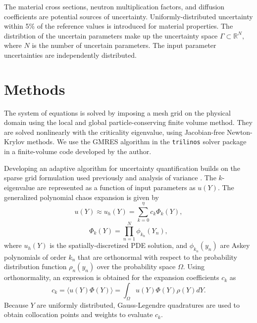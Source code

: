 \documentclass{anstrans} \usepackage{amsmath} \usepackage{amssymb}
\begin{document}
The material cross sections, neutron multiplication factors, and diffusion coefficients are potential
sources of uncertainty.  Uniformly-distributed uncertainty within 5\% of the reference
values is introduced for material properties.  The distribtion of the uncertain parameters  make up 
the uncertainty space
$\Gamma\subset\mathbb{R}^N,$ where $N$ is the number of uncertain parameters.
The input parameter uncertainties are independently distributed.

\section{Methods}
The system of equations is solved by imposing a mesh grid on the physical domain using the local and global
particle-conserving finite volume method.  They are solved nonlinearly with the criticality
eigenvalue, using Jacobian-free Newton-Krylov methods.  We use the GMRES algorithm in the \texttt{trilinos}
solver package in a finite-volume code developed by the author.

Developing an adaptive algorithm for uncertainty quantification builds on the sparse grid formulation used 
previously \cite{ans2014} and
analysis of variance \cite{Ayres}.  The $k$-eigenvalue are represented as a function of input parameters as
$u(Y)$.  The generalized polynomial chaos expansion is given by
\begin{equation}\label{approx}
  u(Y)\approx u_{h}(Y)=\sum_{k=0}^\eta c_k\Phi_k(Y),
\end{equation} 
\begin{equation} 
  \Phi_k(Y)=\prod_{n=1}^N \phi_{k_n}(Y_n), 
\end{equation} 
where $u_h(Y)$ is the
spatially-discretized PDE solution, and $\phi_{k_n}(y_n)$ are Askey polynomials of order $k_n$ that are
orthonormal with respect to the probability distribution function $\rho_n(y_n)$ over the probability space
$\Omega$.
Using orthonormality, an expression is obtained for the expansion coefficients $c_k$ as
\begin{equation}
  c_k = \langle u(Y)\Phi(Y)\rangle = \int_\Omega u(Y)\Phi(Y)\rho(Y) dY.
\end{equation}
Because $Y$ are uniformly distributed, Gauss-Legendre quadratures are used to obtain
collocation points and weights to evaluate $c_k$.
\end{document}
